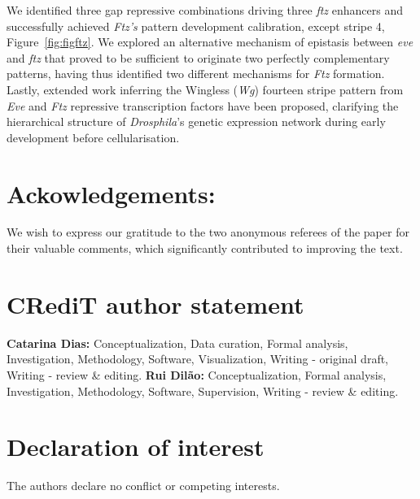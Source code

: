 \documentclass[final,authoryear, 5p, times]{elsarticle}
\begin{document}
We identified three gap repressive combinations driving three \textit{ftz} enhancers and successfully achieved \textit{Ftz's} pattern development calibration, except stripe 4, Figure~\ref{fig:figftz}. We explored an alternative mechanism of epistasis between \textit{eve} and \textit{ftz} that proved to be sufficient to originate two perfectly complementary patterns, having thus identified two different mechanisms for \textit{Ftz} formation.  Lastly, extended work inferring the Wingless (\textit{Wg}) fourteen stripe pattern from \textit{Eve} and \textit{Ftz} repressive transcription factors have been proposed,  clarifying the hierarchical structure of \textit{Drosphila}'s genetic expression network during early development before cellularisation.


\section*{Ackowledgements:}  We wish to express our gratitude to the two anonymous referees of the paper for their valuable comments, which significantly contributed to improving the text.


\section*{CRediT author statement} 
\textbf{Catarina Dias:} Conceptualization, Data curation, Formal analysis, Investigation, Methodology, Software, Visualization, Writing - original draft, Writing - review \& editing. 
\textbf{Rui Dil\~ao:} Conceptualization,  Formal analysis, Investigation, Methodology, Software, Supervision, Writing - review \& editing.

\section*{Declaration of interest}
The authors declare no conflict or competing interests.


\end{document}
